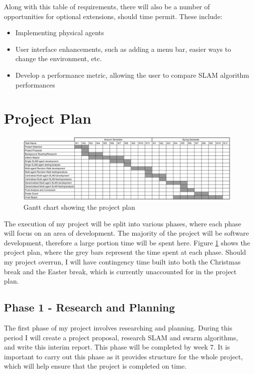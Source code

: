 \documentclass[12pt]{article}
\begin{document}
Along with this table of requirements, there will also be a number of opportunities for optional extensions, should time permit.
These include:
\begin{itemize}
    \item Implementing physical agents
    \item User interface enhancements, such as adding a menu bar, easier ways to change the environment, etc.
    \item Develop a performance metric, allowing the user to compare SLAM algorithm performances
\end{itemize}

\section{Project Plan}
\begin{figure}[H]
    \centering
    \includegraphics[width=0.8\linewidth]{gantt_chart.png}
    \caption{Gantt chart showing the project plan}
    \label{fig:gantt_chart}
\end{figure}
The execution of my project will be split into various phases, where each phase will focus on an area of development. The
majority of the project will be software development, therefore a large portion time will be spent here. Figure
\ref{fig:gantt_chart} shows the project plan, where the grey bars represent the time spent at each phase. Should my project
overrun, I will have contingency time built into both the Christmas break and the Easter break, which is currently unaccounted
for in the project plan.\\

\subsection{Phase 1 - Research and Planning}
The first phase of my project involves researching and planning. During this period I will create a project proposal,
research SLAM and swarm algorithms, and write this interim report. This phase will be completed by week 7. It is important
to carry out this phase as it provides structure for the whole project, which will help ensure that the project is completed
on time.
\end{document}
